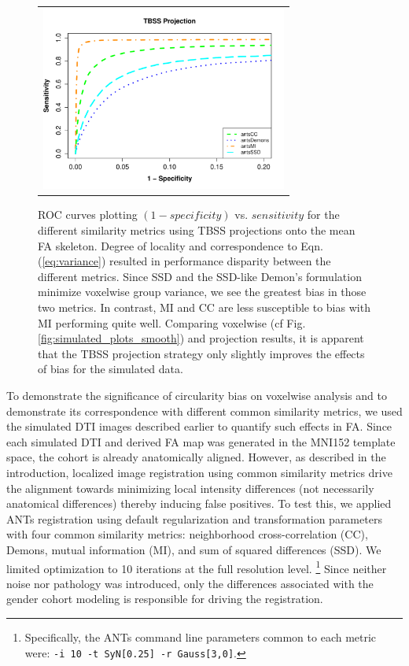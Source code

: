 \documentclass[final,5p,times,twocolumn]{elsarticle}
\begin{document}
\begin{figure}
\begin{center}
\begin{tabular}{c}
  \includegraphics[width=81mm]{ISV_SpeSen_projectionAlreadyAligned.pdf}
\end{tabular}
\caption{ROC curves plotting $(1 - specificity)$ vs. $sensitivity$ for the
different similarity metrics using TBSS projections onto the mean FA skeleton.
Degree of locality and correspondence to 
Eqn. (\ref{eq:variance}) resulted in performance disparity between the
different metrics.  Since SSD and the SSD-like Demon's formulation 
minimize voxelwise group variance, we see the greatest bias in those 
two metrics.  In contrast, MI and CC are less susceptible to bias with
MI performing quite well.  Comparing voxelwise (cf Fig. \ref{fig:simulated_plots_smooth}) 
and projection results, 
it is apparent that the TBSS projection strategy only slightly improves 
the effects of bias for the simulated data.
}
\label{fig:simulated_plots}
\end{center}        
\end{figure}





To demonstrate the significance of circularity bias on voxelwise 
analysis and to demonstrate its correspondence with different
common similarity metrics, we used the simulated DTI images 
described earlier to quantify such effects in FA.
Since each simulated DTI and derived FA map was generated in the
MNI152 template space, the cohort is already anatomically
aligned.  However, as described in the introduction, localized
image registration using common similarity metrics drive the 
alignment towards minimizing local intensity differences (not necessarily
anatomical differences) thereby
inducing false positives.  To test this, we applied ANTs registration
using default regularization and transformation parameters with
four common similarity metrics:  neighborhood cross-correlation (CC), 
Demons, mutual information (MI), and sum of squared differences (SSD).
We limited optimization to 10 iterations at the full resolution 
level.%
\footnote{
Specifically, the ANTs command line parameters common to each metric were:
{\tt -i 10 -t SyN[0.25] -r Gauss[3,0]}.
}
Since neither noise nor pathology was introduced, only the differences
associated with the gender cohort modeling is responsible for driving
the registration.
\end{document}
